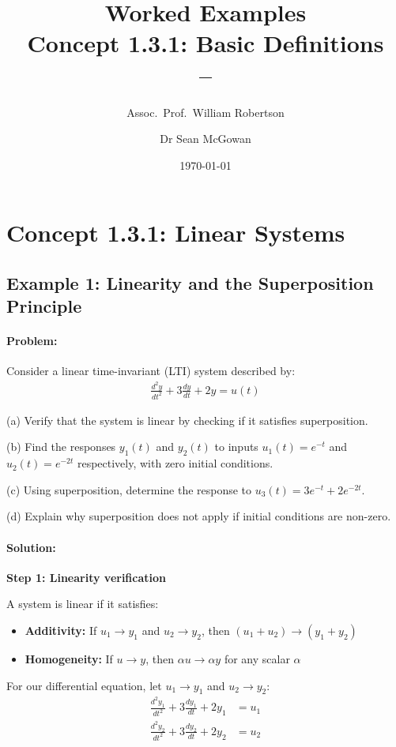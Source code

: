 \documentclass[11pt,a4paper]{article}
\title{\textbf{Worked Examples}\\[0.5em]
\large Concept 1.3.1: Basic Definitions\\[0.3em]
\normalsize \coursesubtitle{} -- \coursetitle}
\author{Assoc.\ Prof.\ William Robertson \and Dr Sean McGowan}
\date{\today}
\begin{document}
\maketitle
\tableofcontents
\newpage

\section{Concept 1.3.1: Linear Systems}

\subsection{Example 1: Linearity and the Superposition Principle}

\paragraph{Problem:} Consider a linear time-invariant (LTI) system described by:
\begin{align}
  \frac{d^2y}{dt^2} + 3\frac{dy}{dt} + 2y = u(t)
\end{align}

(a) Verify that the system is linear by checking if it satisfies superposition.

(b) Find the responses $y_1(t)$ and $y_2(t)$ to inputs $u_1(t) = e^{-t}$ and $u_2(t) = e^{-2t}$ respectively, with zero initial conditions.

(c) Using superposition, determine the response to $u_3(t) = 3e^{-t} + 2e^{-2t}$.

(d) Explain why superposition does not apply if initial conditions are non-zero.

\paragraph{Solution:}

\textbf{Step 1: Linearity verification}

A system is linear if it satisfies:
\begin{itemize}
  \item \textbf{Additivity:} If $u_1 \to y_1$ and $u_2 \to y_2$, then $(u_1 + u_2) \to (y_1 + y_2)$
  \item \textbf{Homogeneity:} If $u \to y$, then $\alpha u \to \alpha y$ for any scalar $\alpha$
\end{itemize}

For our differential equation, let $u_1 \to y_1$ and $u_2 \to y_2$:
\begin{align}
  \frac{d^2y_1}{dt^2} + 3\frac{dy_1}{dt} + 2y_1 &= u_1 \\
  \frac{d^2y_2}{dt^2} + 3\frac{dy_2}{dt} + 2y_2 &= u_2
\end{align}
\end{document}
